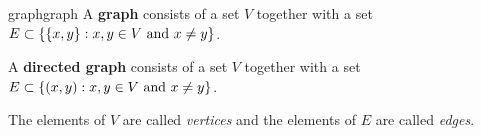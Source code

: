 \begin{topic}{graph}{graph}
    A \textbf{graph} consists of a set $V$ together with a set $E \subset \{ \{ x, y \} : x, y \in V \textup{ and } x \ne y \}$.
    
    A \textbf{directed graph} consists of a set $V$ together with a set $E \subset \{ (x, y) : x, y \in V \textup{ and } x \ne y \}$.
    
    The elements of $V$ are called \textit{vertices} and the elements of $E$ are called \textit{edges}.
\end{topic}

